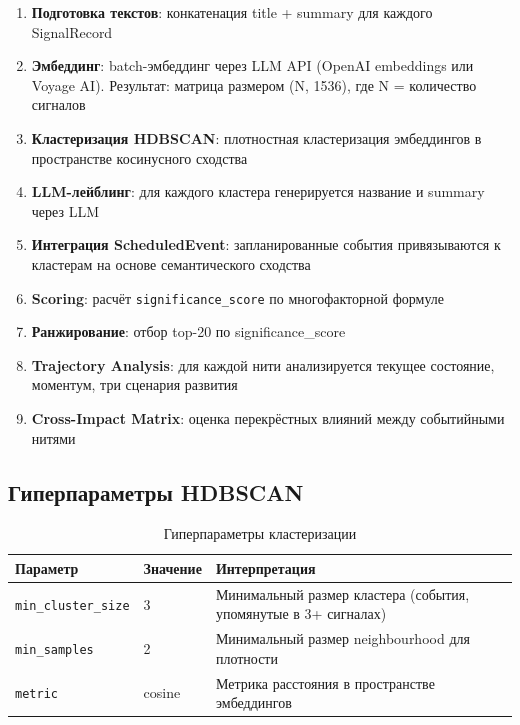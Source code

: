 \begin{enumerate}
    \item \textbf{Подготовка текстов}: конкатенация title + summary для каждого SignalRecord

    \item \textbf{Эмбеддинг}: batch-эмбеддинг через LLM API (OpenAI embeddings или Voyage AI). Результат: матрица размером (N, 1536), где N = количество сигналов

    \item \textbf{Кластеризация HDBSCAN}: плотностная кластеризация эмбеддингов в пространстве косинусного сходства

    \item \textbf{LLM-лейблинг}: для каждого кластера генерируется название и summary через LLM

    \item \textbf{Интеграция ScheduledEvent}: запланированные события привязываются к кластерам на основе семантического сходства

    \item \textbf{Scoring}: расчёт \texttt{significance\_score} по многофакторной формуле

    \item \textbf{Ранжирование}: отбор top-20 по significance\_score

    \item \textbf{Trajectory Analysis}: для каждой нити анализируется текущее состояние, моментум, три сценария развития

    \item \textbf{Cross-Impact Matrix}: оценка перекрёстных влияний между событийными нитями
\end{enumerate}


\subsection{Гиперпараметры HDBSCAN}

\begin{table}[h!]
\centering
\caption{Гиперпараметры кластеризации}
\label{tab:hdbscan_params}
\begin{tabular}{|l|l|l|}
\hline
\textbf{Параметр} & \textbf{Значение} & \textbf{Интерпретация} \\
\hline
\texttt{min\_cluster\_size} & 3 & Минимальный размер кластера (события, упомянутые в 3+ сигналах) \\
\texttt{min\_samples} & 2 & Минимальный размер neighbourhood для плотности \\
\texttt{metric} & cosine & Метрика расстояния в пространстве эмбеддингов \\
\hline
\end{tabular}
\end{table}

